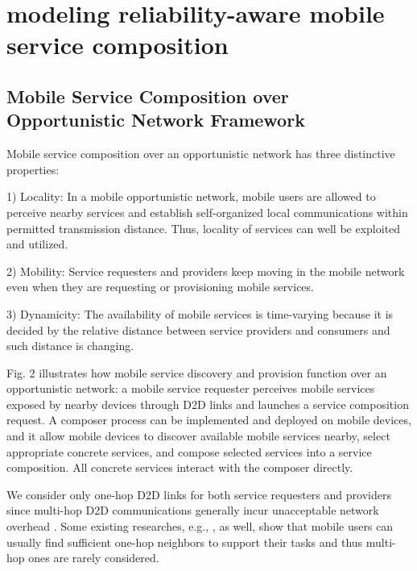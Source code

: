 \documentclass[journal]{IEEEtran}
\begin{document}
\section{modeling reliability-aware mobile service composition}

\subsection{Mobile Service Composition over Opportunistic Network Framework}

Mobile service composition over an opportunistic network has three distinctive properties:

1) Locality: In a mobile opportunistic network, mobile users are allowed to perceive nearby services and establish self-organized local communications within permitted transmission distance. Thus, locality of services can well be exploited and utilized.

2) Mobility: Service requesters and providers keep moving in the mobile network even when they are requesting or provisioning mobile services.

3) Dynamicity: The availability of mobile services is time-varying because it is decided by the relative distance between service providers and consumers and such distance is changing.

Fig. 2 illustrates how mobile service discovery and provision function over an opportunistic network: a mobile service requester perceives mobile services exposed by nearby devices through D2D links and launches a service composition request. 
A composer process can be implemented and deployed on mobile devices, and it allow mobile devices to discover available mobile services nearby, select appropriate concrete services, and compose selected services into a service composition. 
All concrete services interact with the composer directly.

We consider only one-hop D2D links for both service requesters and providers since multi-hop D2D communications generally incur unacceptable network overhead \cite{li2014can}. 
Some existing researches, e.g., \cite{chang2015progressive, tuncay2013participant, wu2013homing, jiang2016exploiting, liu2013exploring}, as well, show that mobile users can usually find sufficient one-hop neighbors to support their tasks and thus multi-hop ones are rarely considered.

\end{document}
